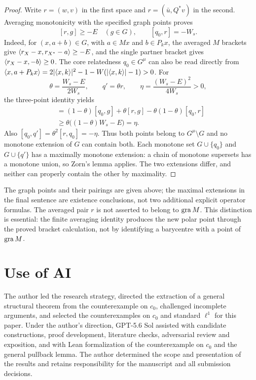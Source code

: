 \begin{proof}
Write $r=(w,v)$ in the first space and
$r=(\bar u,Q^*v)$ in the second. Averaging monotonicity with
the specified graph points proves
\[
[r,g]\ge-E\quad(g\in G),\qquad [q_0,r]=-W_s.
\]
Indeed, for $(x,a+b)\in G$, with $a\in Mx$ and $b\in P_kx$, the averaged $M$ brackets
give $\langle r_X-x,r_{X^*}-a\rangle\ge-E$, and the single
partner bracket gives $\langle r_X-x,-b\rangle\ge0$.
The core relatedness $q_0\in G^\mu$ can also be read directly
from $\langle x,a+P_kx\rangle=2|\langle x,k\rangle|^2-1-W(|\langle x,k\rangle|-1)>0$.
For
\[
\theta=\frac{W_s-E}{2W_s},\qquad q'=\theta r,
\qquad \eta=\frac{(W_s-E)^2}{4W_s}>0,
\]
the three-point identity yields
\begin{align*}
[q',g]
&=(1-\theta)[q_0,g]+\theta[r,g]
                 -\theta(1-\theta)[q_0,r]\\
&\ge\theta\bigl((1-\theta)W_s-E\bigr)=\eta.
\end{align*}
Also $[q_0,q']=\theta^2[r,q_0]=-\eta$.
Thus both points belong to $G^\mu\setminus G$ and no monotone
extension of $G$ can contain both. Each monotone set
$G\cup\{q_0\}$ and $G\cup\{q'\}$ has a maximally monotone
extension: a chain of monotone supersets has a monotone union,
so Zorn's lemma applies. The two extensions differ, and neither
can properly contain the other by maximality.
\end{proof}
The graph points and their pairings are given above; the maximal
extensions in the final sentence are existence conclusions, not
two additional explicit operator formulas. The averaged pair $r$
is not asserted to belong to $\operatorname{gra} M$. This distinction is essential:
the finite averaging identity produces the new polar point through
the proved bracket calculation, not by identifying a barycentre
with a point of $\operatorname{gra} M$.




\section*{Use of AI}
The author led the research strategy, directed the extraction of a general
structural theorem from the counterexample on $c_0$, challenged incomplete
arguments, and selected the counterexamples on $c_0$ and standard $\ell^1$
for this paper. Under the author's direction, GPT-5.6 Sol assisted with
candidate constructions, proof development, literature checks, adversarial
review and exposition, and with Lean formalization of the counterexample
on $c_0$ and the general pullback lemma. The author determined the scope
and presentation of the results and retains responsibility for the
manuscript and all submission decisions.

